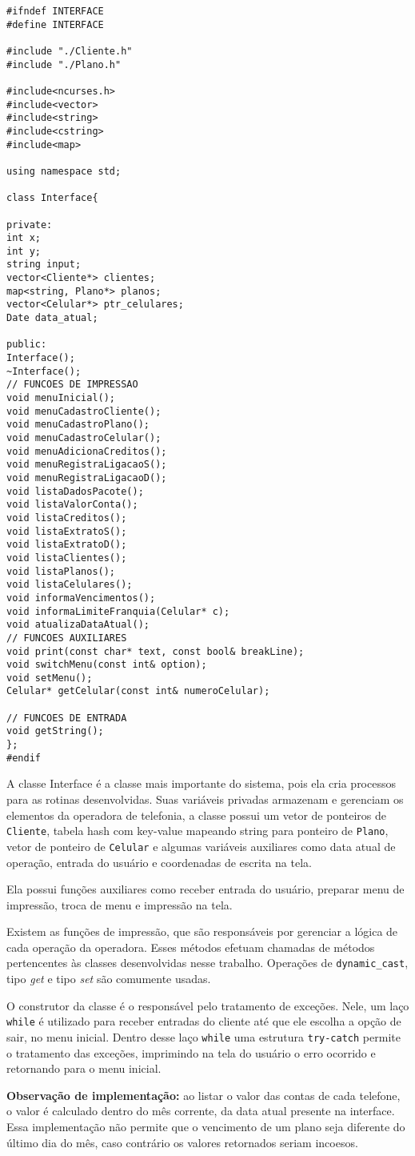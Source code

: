 \begin{lstlisting}[basicstyle=\tiny]
#ifndef INTERFACE
#define INTERFACE

#include "./Cliente.h"
#include "./Plano.h"

#include<ncurses.h>
#include<vector>
#include<string>
#include<cstring>
#include<map>

using namespace std;

class Interface{

private:
int x;
int y;
string input;
vector<Cliente*> clientes;
map<string, Plano*> planos;
vector<Celular*> ptr_celulares;
Date data_atual;

public:
Interface();
~Interface();
// FUNCOES DE IMPRESSAO
void menuInicial();
void menuCadastroCliente();
void menuCadastroPlano();
void menuCadastroCelular();
void menuAdicionaCreditos();
void menuRegistraLigacaoS();
void menuRegistraLigacaoD();
void listaDadosPacote();
void listaValorConta();
void listaCreditos();
void listaExtratoS();
void listaExtratoD();
void listaClientes();
void listaPlanos();
void listaCelulares();
void informaVencimentos();
void informaLimiteFranquia(Celular* c);
void atualizaDataAtual();
// FUNCOES AUXILIARES
void print(const char* text, const bool& breakLine);
void switchMenu(const int& option);
void setMenu();
Celular* getCelular(const int& numeroCelular);

// FUNCOES DE ENTRADA
void getString();
};
#endif
\end{lstlisting}

A classe Interface é a classe mais importante do sistema, pois ela cria processos para as rotinas desenvolvidas. Suas variáveis privadas armazenam e gerenciam os elementos da operadora de telefonia, a classe possui um vetor de ponteiros de \texttt{Cliente}, tabela hash com key-value mapeando string para ponteiro de \texttt{Plano}, vetor de ponteiro de \texttt{Celular} e algumas variáveis auxiliares como data atual de operação, entrada do usuário e coordenadas de escrita na tela.

Ela possui funções auxiliares como receber entrada do usuário, preparar menu de impressão, troca de menu e impressão na tela.

Existem as funções de impressão, que são responsáveis por gerenciar a lógica de cada operação da operadora. Esses métodos efetuam chamadas de métodos pertencentes às classes desenvolvidas nesse trabalho. Operações de \texttt{dynamic\_cast}, tipo \textit{get} e tipo \textit{set} são comumente usadas.

O construtor da classe é o responsável pelo tratamento de exceções. Nele, um laço \texttt{while} é utilizado para receber entradas do cliente até que ele escolha a opção de sair, no menu inicial. Dentro desse laço \texttt{while} uma estrutura \texttt{try-catch} permite o tratamento das exceções, imprimindo na tela do usuário o erro ocorrido e retornando para o menu inicial.

\textbf{Observação de implementação:} ao listar o valor das contas de cada telefone, o valor é calculado dentro do mês corrente, da data atual presente na interface. Essa implementação não permite que o vencimento de um plano seja diferente do último dia do mês, caso contrário os valores retornados seriam incoesos.
